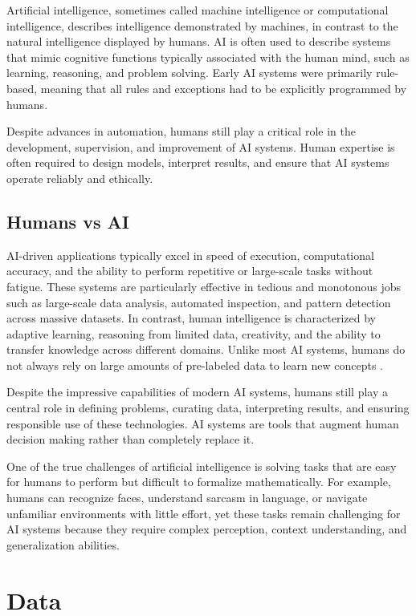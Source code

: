 \documentclass{article}
\begin{document}
Artificial intelligence, sometimes called machine intelligence or computational intelligence, describes intelligence demonstrated by machines, in contrast to the natural intelligence displayed by humans. AI is often used to describe systems that mimic cognitive functions typically associated with the human mind, such as learning, reasoning, and problem solving. Early AI systems were primarily rule-based, meaning that all rules and exceptions had to be explicitly programmed by humans.

Despite advances in automation, humans still play a critical role in the development, supervision, and improvement of AI systems. Human expertise is often required to design models, interpret results, and ensure that AI systems operate reliably and ethically.

\subsection{Humans vs AI}

AI-driven applications typically excel in speed of execution, computational accuracy, and the ability to perform repetitive or large-scale tasks without fatigue. These systems are particularly effective in tedious and monotonous jobs such as large-scale data analysis, automated inspection, and pattern detection across massive datasets. In contrast, human intelligence is characterized by adaptive learning, reasoning from limited data, creativity, and the ability to transfer knowledge across different domains. Unlike most AI systems, humans do not always rely on large amounts of pre-labeled data to learn new concepts \cite{springboard_ai}.

Despite the impressive capabilities of modern AI systems, humans still play a central role in defining problems, curating data, interpreting results, and ensuring responsible use of these technologies. AI systems are tools that augment human decision making rather than completely replace it.

One of the true challenges of artificial intelligence is solving tasks that are easy for humans to perform but difficult to formalize mathematically. For example, humans can recognize faces, understand sarcasm in language, or navigate unfamiliar environments with little effort, yet these tasks remain challenging for AI systems because they require complex perception, context understanding, and generalization abilities.


\section{Data}
\end{document}

